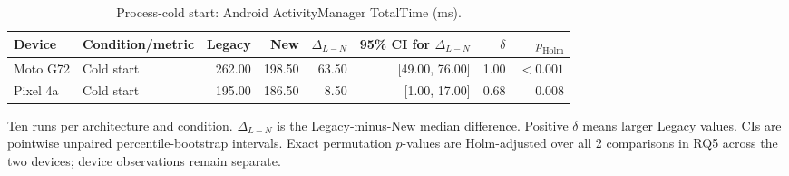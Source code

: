 \begin{table}[!t]
\centering
\caption{Process-cold start: Android ActivityManager TotalTime (ms).}
\label{tab:s5}
\small\setlength{\tabcolsep}{5pt}
\begin{tabular}{llrrrrrr}
\toprule
Device & Condition/metric & Legacy & New & $\Delta_{L-N}$ & 95\% CI for $\Delta_{L-N}$ & $\delta$ & $p_{\mathrm{Holm}}$ \\
\midrule
Moto G72 & Cold start & 262.00 & 198.50 & 63.50 & [49.00, 76.00] & 1.00 & $<0.001$ \\
Pixel 4a & Cold start & 195.00 & 186.50 & 8.50 & [1.00, 17.00] & 0.68 & $0.008$ \\
\bottomrule
\end{tabular}
\par\smallskip
\begin{minipage}{0.98\textwidth}\footnotesize
Ten runs per architecture and condition. $\Delta_{L-N}$ is the Legacy-minus-New median difference. Positive $\delta$ means larger Legacy values. CIs are pointwise unpaired percentile-bootstrap intervals. Exact permutation $p$-values are Holm-adjusted over all 2 comparisons in RQ5 across the two devices; device observations remain separate.
\end{minipage}
\end{table}
